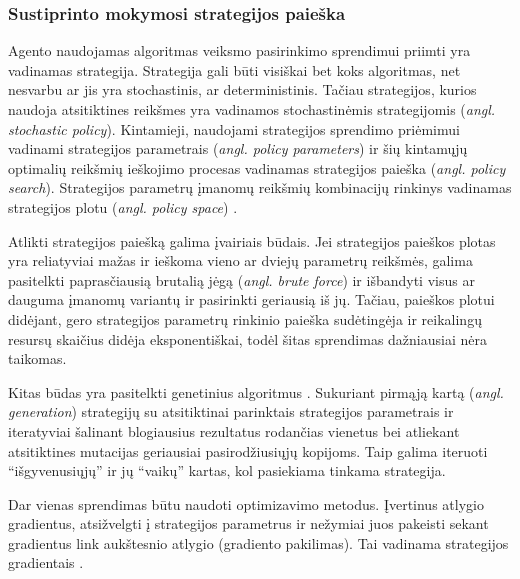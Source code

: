 \documentclass{VUMIFPSbakalaurinis}
\begin{document}
\subsubsection{Sustiprinto mokymosi strategijos paieška}
{
	Agento naudojamas algoritmas veiksmo pasirinkimo sprendimui priimti yra vadinamas strategija. Strategija gali būti visiškai bet koks algoritmas, net nesvarbu ar jis yra stochastinis, ar deterministinis. Tačiau strategijos, kurios naudoja atsitiktines reikšmes yra vadinamos stochastinėmis strategijomis (\textit{angl. stochastic policy}). Kintamieji, naudojami strategijos sprendimo priėmimui vadinami strategijos parametrais (\textit{angl. policy parameters}) ir šių kintamųjų optimalių reikšmių ieškojimo procesas vadinamas strategijos paieška (\textit{angl. policy search}). Strategijos parametrų įmanomų reikšmių kombinacijų rinkinys vadinamas strategijos plotu (\textit{angl. policy space}) \cite{handson}.\par
	
	Atlikti strategijos paiešką galima įvairiais būdais. Jei strategijos paieškos plotas yra reliatyviai mažas ir ieškoma vieno ar dviejų parametrų reikšmės, galima pasitelkti paprasčiausią brutalią jėgą (\textit{angl. brute force}) ir išbandyti visus ar dauguma įmanomų variantų ir pasirinkti geriausią iš jų. Tačiau, paieškos plotui didėjant, gero strategijos parametrų rinkinio paieška sudėtingėja ir reikalingų resursų skaičius didėja eksponentiškai, todėl šitas sprendimas dažniausiai nėra taikomas.\par
	
	Kitas būdas yra pasitelkti genetinius algoritmus \cite{genetic_algorithm_book}. Sukuriant pirmąją kartą (\textit{angl. generation}) strategijų su atsitiktinai parinktais strategijos parametrais ir iteratyviai šalinant blogiausius rezultatus rodančias vienetus bei atliekant atsitiktines mutacijas geriausiai pasirodžiusiųjų kopijoms. Taip galima iteruoti \enquote{išgyvenusiųjų} ir jų \enquote{vaikų} kartas, kol pasiekiama tinkama strategija. \par
	
	Dar vienas sprendimas būtu naudoti optimizavimo metodus. Įvertinus atlygio gradientus, atsižvelgti į strategijos parametrus ir nežymiai juos pakeisti sekant gradientus link aukštesnio atlygio (gradiento pakilimas). Tai vadinama strategijos gradientais \cite{handson}.	
}
\end{document}
